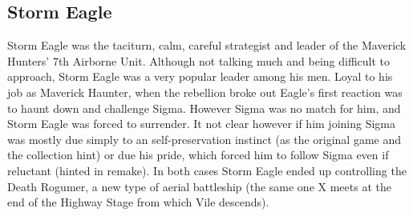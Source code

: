  \subsection{Storm Eagle}\label{boss:Storm_Eagle}
 Storm Eagle was the taciturn, calm, careful strategist and leader of the Maverick Hunters' 7th Airborne Unit\cite{wiki:Storm_Eagle}. Although not talking much and being difficult to approach, Storm Eagle was a very popular leader among his men\cite{MHX:manual}. Loyal to his job as Maverick Haunter, when the rebellion broke out Eagle's first reaction was to haunt down and challenge Sigma. However Sigma was no match for him, and Storm Eagle was forced to surrender. It not clear however if him joining Sigma was mostly due simply to an self-preservation instinct (as the original game and the collection hint\cite{Xcoll1:Manual_X1}) or due his pride, which forced him to follow Sigma even if reluctant (hinted in remake). In both cases Storm Eagle ended up controlling the Death Rogumer, a new type of aerial battleship (the same one X meets at the end of the Highway Stage from which Vile descends).
 
